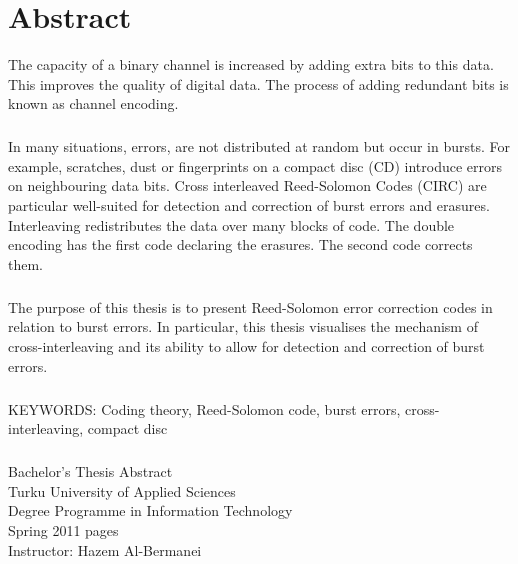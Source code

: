 \documentclass[../main.tex]{subfiles}
\begin{document}
    \chapter*{Abstract}

    The capacity of a binary channel is increased by adding extra bits to this data. This improves the quality of digital data. The process of adding redundant bits is known as channel encoding.

    \paragraph{}
    In many situations, errors, are not distributed at random but occur in bursts. For example, scratches, dust or fingerprints on a compact disc (CD) introduce errors on neighbouring data bits. Cross interleaved Reed-Solomon Codes (CIRC) are particular well-suited for detection and correction of burst errors and erasures. Interleaving redistributes the data over many blocks of code. The double encoding has the first code declaring the erasures. The second code corrects them.

    \paragraph{}
    The purpose of this thesis is to present Reed-Solomon error correction codes in relation to burst errors. In particular, this thesis visualises the mechanism of cross-interleaving and its ability to allow for detection and correction of burst errors.

    \paragraph{}
    KEYWORDS: Coding theory, Reed-Solomon code, burst errors, cross-inter\-leaving, compact disc

    \paragraph{}
    Bachelor's Thesis \textbar\space Abstract \\
    Turku University of Applied Sciences \\
    Degree Programme in Information Technology \\
    Spring 2011 \textbar\space \pageref{LastPage} pages \\
    Instructor: Hazem Al-Bermanei \\
\end{document}
